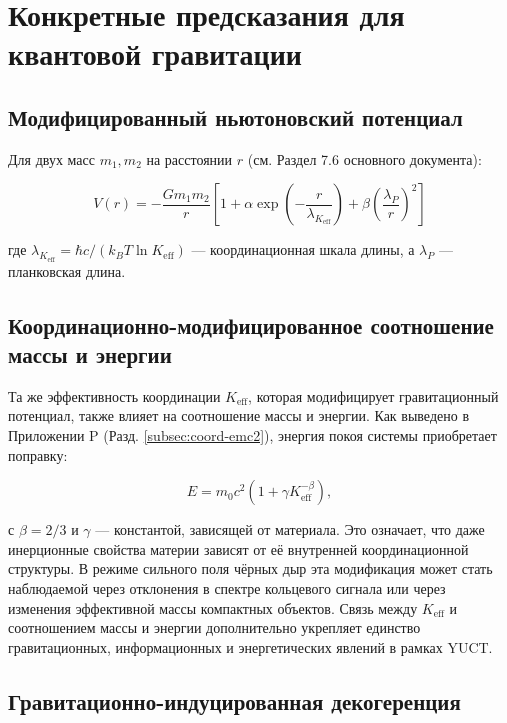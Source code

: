 \documentclass[12pt,a4paper]{article}
\theoremstyle{remark}
\newcommand{\Keff}{K_{\mathrm{eff}}}
\begin{document}
	\section{Конкретные предсказания для квантовой гравитации}
	\label{sec:predictions}
	
	\subsection{Модифицированный ньютоновский потенциал}
	
	Для двух масс $m_1, m_2$ на расстоянии $r$ (см. Раздел 7.6 основного документа):
	
	\begin{equation}
		V(r) = -\frac{G m_1 m_2}{r} \left[ 1 + \alpha \exp\left(-\frac{r}{\lambda_{\Keff}}\right) + \beta \left(\frac{\lambda_P}{r}\right)^2 \right]
	\end{equation}
	
	где $\lambda_{\Keff} = \hbar c / (k_B T \ln \Keff)$ — координационная шкала длины, а $\lambda_P$ — планковская длина.
	
	\subsection{Координационно-модифицированное соотношение массы и энергии}
	\label{subsec:coord-emc2-G}
	
	Та же эффективность координации $K_{\mathrm{eff}}$, которая модифицирует гравитационный потенциал, также влияет на соотношение массы и энергии. Как выведено в Приложении P (Разд. \ref{subsec:coord-emc2}), энергия покоя системы приобретает поправку:
	
	\[
	E = m_{0} c^{2} \left(1 + \gamma K_{\mathrm{eff}}^{-\beta}\right),
	\]
	
	с $\beta = 2/3$ и $\gamma$ — константой, зависящей от материала. Это означает, что даже инерционные свойства материи зависят от её внутренней координационной структуры. В режиме сильного поля чёрных дыр эта модификация может стать наблюдаемой через отклонения в спектре кольцевого сигнала или через изменения эффективной массы компактных объектов. Связь между $K_{\mathrm{eff}}$ и соотношением массы и энергии дополнительно укрепляет единство гравитационных, информационных и энергетических явлений в рамках YUCT.
	
	\subsection{Гравитационно-индуцированная декогеренция}
	
\end{document}
